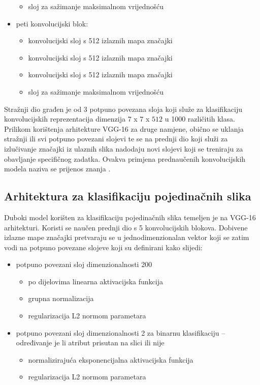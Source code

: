 \documentclass[times, utf8, diplomski, numeric]{fer}
\begin{document}
\begin{itemize}
\begin{itemize}
  \item sloj za sažimanje maksimalnom vrijednošću
 \end{itemize}
     \item peti konvolucijski blok:
 \begin{itemize}
  \item konvolucijski sloj s 512 izlaznih mapa značajki
  \item konvolucijski sloj s 512 izlaznih mapa značajki
  \item konvolucijski sloj s 512 izlaznih mapa značajki
  \item sloj za sažimanje maksimalnom vrijednošću
 \end{itemize}
\end{itemize}

Stražnji dio građen je od  3 potpuno povezana sloja koji služe za klasifikaciju konvolucijskih reprezentacija dimenzija $7$ x $7$ x $512$ u 1000 različitih klasa. 
Prilikom korištenja arhitekture VGG-16 za druge namjene, obično se uklanja stražnji ili svi potpuno povezani slojevi te se na prednji dio koji služi za izlučivanje značajki iz ulaznih slika nadodaju novi slojevi koji se treniraju za obavljanje specifičnog zadatka.
Ovakva primjena prednaučenih konvolucijskih modela naziva se prijenos znanja  \citep{proceeding:transfer_learning}.

\subsection{Arhitektura za klasifikaciju pojedinačnih slika}
Duboki model korišten za klasifikaciju pojedinačnih slika temeljen je na VGG-16 arhitekturi. 
Koristi se naučen prednji dio s 5 konvolucijskih blokova. 
Dobivene izlazne mape značajki pretvaraju se u jednodimenzionalan vektor koji se zatim vodi na potpuno povezane slojeve koji su definirani kako slijedi:
\begin{itemize}
 \item potpuno povezani sloj dimenzionalnosti 200
 \begin{itemize}
  \item po dijelovima linearna  aktivacijska funkcija
  \item grupna normalizacija 
  \item regularizacija L2 normom parametara
 \end{itemize}
 \item potpuno povezani sloj dimenzionalnosti 2 za binarnu klasifikaciju -- određivanje je li atribut prisutan na slici ili nije
 \begin{itemize}
  \item normalizirajuća eksponencijalna  aktivacijska funkcija
  \item regularizacija L2 normom parametara
 \end{itemize}
\end{itemize}
\end{document}
